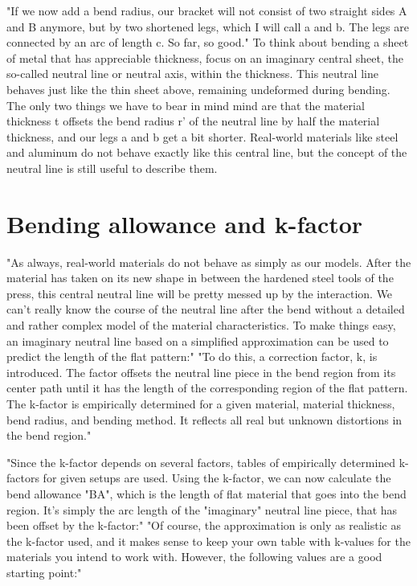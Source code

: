 "If we now add a bend radius, our bracket will not consist of two straight sides A and B anymore, but by two shortened legs, which I will call a and b. The legs are connected by an arc of length c. So far, so good."
To think about bending a sheet of metal that has appreciable thickness, focus on an imaginary central sheet, the so-called neutral line or neutral axis, within the thickness. This neutral line behaves just like the thin sheet above, remaining undeformed during bending. The only two things we have to bear in mind mind are that the material thickness t offsets the bend radius r’ of the neutral line by half the material thickness, and our legs a and b get a bit shorter. Real-world materials like steel and aluminum do not behave exactly like this central line, but the concept of the neutral line is still useful to describe them.

\section{Bending allowance and k-factor}
"As always, real-world materials do not behave as simply as our models. After the material has taken on its new shape in between the hardened steel tools of the press, this central neutral line will be pretty messed up by the interaction. We can’t really know the course of the neutral line after the bend without a detailed and rather complex model of the material characteristics. To make things easy, an imaginary neutral line based on a simplified approximation can be used to predict the length of the flat pattern:"
"To do this, a correction factor, k, is introduced. The factor offsets the neutral line piece in the bend region from its center path until it has the length of the corresponding region of the flat pattern. The k-factor is empirically determined for a given material, material thickness, bend radius, and bending method. It reflects all real but unknown distortions in the bend region."

"Since the k-factor depends on several factors, tables of empirically determined k-factors for given setups are used. Using the k-factor, we can now calculate the bend allowance "BA", which is the length of flat material that goes into the bend region. It’s simply the arc length of the "imaginary" neutral line piece, that has been offset by the k-factor:"
"Of course, the approximation is only as realistic as the k-factor used, and it makes sense to keep your own table with k-values for the materials you intend to work with. However, the following values are a good starting point:"

